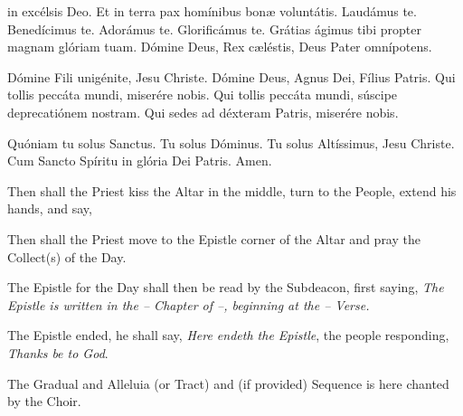     { in excélsis Deo. Et in terra pax homínibus bon{\ae} voluntátis. Laudámus te. Benedícimus te. Adorámus te. Glorificámus te. Grátias ágimus tibi propter magnam glóriam tuam. Dómine Deus, Rex c{\ae}léstis, Deus Pater omnípotens.\par
    Dómine Fili unigénite, Jesu Christe. Dómine Deus, Agnus Dei, Fílius Patris. Qui tollis peccáta mundi, miserére nobis. Qui tollis peccáta mundi, súscipe deprecatiónem nostram. Qui sedes ad déxteram Patris, miserére nobis.\par
    Quóniam tu solus Sanctus. Tu solus Dóminus. Tu solus Altíssimus, Jesu Christe. Cum Sancto Spíritu {} in glória Dei Patris. Amen.}
\clearpage
\begin{rubric}
    Then shall the Priest kiss the Altar in the middle, turn to the People, extend his hands, and say,
\end{rubric}
\begin{rubric}
	Then shall the Priest move to the Epistle corner of the Altar and pray the Collect(s) of the Day.
\end{rubric}
\begin{rubric}
	The Epistle for the Day shall then be read by the Subdeacon, first saying, \emph{The Epistle is written in the \emph{--} Chapter of \emph{--}, beginning at the \emph{--} Verse.}
\end{rubric}
\begin{rubric}
	The Epistle ended, he shall say, \emph{Here endeth the Epistle}, the people responding, \emph{Thanks be to God}.
\end{rubric}
\begin{rubric}
    The Gradual and Alleluia (or Tract) and (if provided) Sequence is here chanted by the Choir.
\end{rubric}
